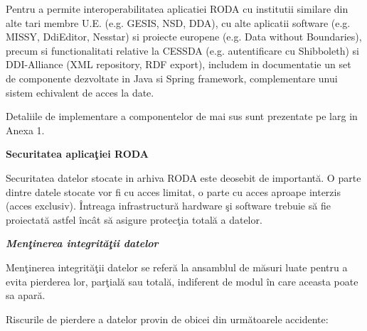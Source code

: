 \documentclass[a4paper]{article}
\begin{document}
{\bigskip

{
Pentru a permite interoperabilitatea aplicatiei RODA cu institutii similare din alte tari membre U.E. (e.g. GESIS, NSD,
DDA), cu alte aplicatii software (e.g. MISSY, DdiEditor, Nesstar) si proiecte europene (e.g. {\textquotedbl}Data
without Boundaries{\textquotedbl}), precum si functionalitati relative la CESSDA (e.g. autentificare cu Shibboleth) si
DDI-Alliance (XML repository, RDF export), includem in documentatie un set de componente dezvoltate in Java si Spring
framework, complementare unui sistem echivalent de acces la date.}


\bigskip

{
Detaliile de implementare a componentelor de mai sus sunt prezentate pe larg in Anexa 1.}

\bigskip

{\bfseries\color[rgb]{0.0,0.0,0.039215688}
Securitatea aplica\c{t}iei RODA}

{
Securitatea datelor stocate in arhiva RODA este deosebit de important\u{a}. O parte dintre datele stocate vor fi cu
acces limitat, o parte cu acces aproape interzis (acces exclusiv). \^Intreaga infrastructur\u{a} hardware \c{s}i
software trebuie s\u{a} fie proiectat\u{a} astfel \^inc\^at s\u{a} asigure protec\c{t}ia total\u{a} a datelor.}

{\bfseries\itshape\color[rgb]{0.0,0.0,0.039215688}
Men\c{t}inerea integrit\u{a}\c{t}ii datelor}

{
Men\c{t}inerea integrit\u{a}\c{t}ii datelor se refer\u{a} la ansamblul de m\u{a}suri luate pentru a evita pierderea
lor, par\c{t}ial\u{a} sau total\u{a}, indiferent de modul \^in care aceasta poate sa apar\u{a}.}


\bigskip

{
Riscurile de pierdere a datelor provin de obicei din urm\u{a}toarele accidente:}


\bigskip

}
\end{document}
